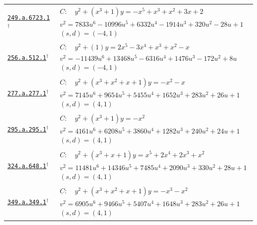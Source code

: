 \documentclass[10pt]{article}
\newcommand{\entryseparator}{\noalign{\vskip3pt\hbox to\linewidth{\leaders\hbox{\kern2pt\rule{3pt}{0.3pt}\kern2pt}\hfill}\nobreak\vskip3pt\nobreak}}
\begin{document}
\begin{landscape}
\begin{longtable}{@{}p{3.4cm}p{\dimexpr\linewidth-3.4cm-2\tabcolsep\relax}@{}}
\entryseparator
\href{https://www.lmfdb.org/Genus2Curve/Q/249/a/6723/1}{\texttt{249.a.6723.1}}$^{\dagger}$ & $\begin{gathered}C:\quad y^2+\left(x^{3} + 1\right)y=-x^{5} + x^{3} + x^{2} + 3 x + 2\\v^2=7833 u^{6} - 10996 u^{5} + 6332 u^{4} - 1914 u^{3} + 320 u^{2} - 28 u + 1\\(s,d)=(-4,1)\end{gathered}$ \\
\entryseparator
\href{https://www.lmfdb.org/Genus2Curve/Q/256/a/512/1}{\texttt{256.a.512.1}}$^{\dagger}$ & $\begin{gathered}C:\quad y^2+\left(1\right)y=2 x^{5} - 3 x^{4} + x^{3} + x^{2} - x\\v^2=-11439 u^{6} + 13468 u^{5} - 6316 u^{4} + 1476 u^{3} - 172 u^{2} + 8 u\\(s,d)=(-4,1)\end{gathered}$ \\
\entryseparator
\href{https://www.lmfdb.org/Genus2Curve/Q/277/a/277/1}{\texttt{277.a.277.1}}$^{\dagger}$ & $\begin{gathered}C:\quad y^2+\left(x^{3} + x^{2} + x + 1\right)y=-x^{2} - x\\v^2=7145 u^{6} + 9654 u^{5} + 5455 u^{4} + 1652 u^{3} + 283 u^{2} + 26 u + 1\\(s,d)=(4,1)\end{gathered}$ \\
\entryseparator
\href{https://www.lmfdb.org/Genus2Curve/Q/295/a/295/1}{\texttt{295.a.295.1}}$^{\dagger}$ & $\begin{gathered}C:\quad y^2+\left(x^{3} + 1\right)y=-x^{2}\\v^2=4161 u^{6} + 6208 u^{5} + 3860 u^{4} + 1282 u^{3} + 240 u^{2} + 24 u + 1\\(s,d)=(4,1)\end{gathered}$ \\
\entryseparator
\href{https://www.lmfdb.org/Genus2Curve/Q/324/a/648/1}{\texttt{324.a.648.1}}$^{\dagger}$ & $\begin{gathered}C:\quad y^2+\left(x^{3} + x + 1\right)y=x^{5} + 2 x^{4} + 2 x^{3} + x^{2}\\v^2=11481 u^{6} + 14346 u^{5} + 7485 u^{4} + 2090 u^{3} + 330 u^{2} + 28 u + 1\\(s,d)=(4,1)\end{gathered}$ \\
\entryseparator
\href{https://www.lmfdb.org/Genus2Curve/Q/349/a/349/1}{\texttt{349.a.349.1}}$^{\dagger}$ & $\begin{gathered}C:\quad y^2+\left(x^{3} + x^{2} + x + 1\right)y=-x^{3} - x^{2}\\v^2=6905 u^{6} + 9466 u^{5} + 5407 u^{4} + 1648 u^{3} + 283 u^{2} + 26 u + 1\\(s,d)=(4,1)\end{gathered}$ \\

\end{longtable}
\end{landscape}
\end{document}
